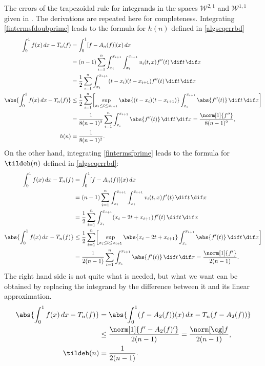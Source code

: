 The errors of the trapezoidal rule for integrands in the spaces $\mathcal{W}^{2,1}$ and $\mathcal{W}^{1,1}$ given in \cite[(7.14) and (7.15)]{BraPet11a}. The derivations are repeated here for completeness. Integrating \eqref{fintermsfdoubprime} leads to the formula for $h(n)$ defined in \eqref{algseqerrbd}
\begin{align*}
\int_0^1 f(x) \, dx - T_n(f) & = \int_0^ 1 [f-A_n (f)](x) \, dx\\
& = (n-1) \sum_{i=1}^n \int_{x_i}^{x_{i+1}} \int_{x_i}^{x_{i+1}} u_i(t,x) f''(t) \, \dif t \, \dif x \\
& = \frac{1}{2} \sum_{i=1}^n \int_{x_i}^{x_{i+1}} (t-x_i)(t-x_{i+1}) f''(t) \, \dif t \, \dif x \\
\abs{\int_0^1 f(x) \, dx - T_n(f)} & \le \frac{1}{2} \sum_{i=1}^n \biggl [\sup_{x_i \le t \le x_{i+1}} \abs{(t-x_i)(t-x_{i+1})} \int_{x_i}^{x_{i+1}} \abs{f''(t)} \, \dif t \, \dif x \biggr ] \\
& = \frac{1}{8(n-1)^2} \sum_{i=1}^n \int_{x_i}^{x_{i+1}} \abs{f''(t)} \, \dif t \, \dif x = \frac{\norm[1]{f''}}{8(n-1)^2}, \\
h(n)&= \frac{1}{8(n-1)^2}.
\end{align*}
On the other hand, integrating \eqref{fintermsfprime} leads to the formula for $\tildeh(n)$ defined in \eqref{algseqerrbd}:
\begin{align*}
\int_0^1 f(x) \, dx - T_n(f) & = \int_0^ 1 [f-A_n (f)](x) \, dx\\
& = (n-1) \sum_{i=1}^n \int_{x_i}^{x_{i+1}} \int_{x_i}^{x_{i+1}} v_i(t,x) f'(t) \, \dif t \, \dif x \\
& = \frac{1}{2} \sum_{i=1}^n \int_{x_i}^{x_{i+1}} (x_i-2t+x_{i+1}) f'(t) \, \dif t \, \dif x \\
\abs{\int_0^1 f(x) \, dx - T_n(f)} & \le \frac{1}{2} \sum_{i=1}^n \biggl [\sup_{x_i \le t \le x_{i+1}} \abs{x_i-2t+x_{i+1}} \int_{x_i}^{x_{i+1}} \abs{f'(t)} \, \dif t \, \dif x \biggr ] \\
& = \frac{1}{2(n-1)} \sum_{i=1}^n \int_{x_i}^{x_{i+1}} \abs{f'(t)} \, \dif t \, \dif x = \frac{\norm[1]{f'}}{2(n-1)}.
\end{align*}
The right hand side is not quite what is needed, but what we want can be obtained by replacing the integrand by the difference between it and its linear approximation.
\begin{align*}
\abs{\int_0^1 f(x) \, dx - T_n(f)} & =\abs{\int_0^1 (f-A_2(f))(x) \, dx - T_n(f-A_2(f))} \\
&\le \frac{\norm[1]{f'-A_2(f)'}}{2(n-1)}=\frac{\Gnorm{f}}{2(n-1)}, \\
\tildeh(n)&= \frac{1}{2(n-1)}.
\end{align*}

